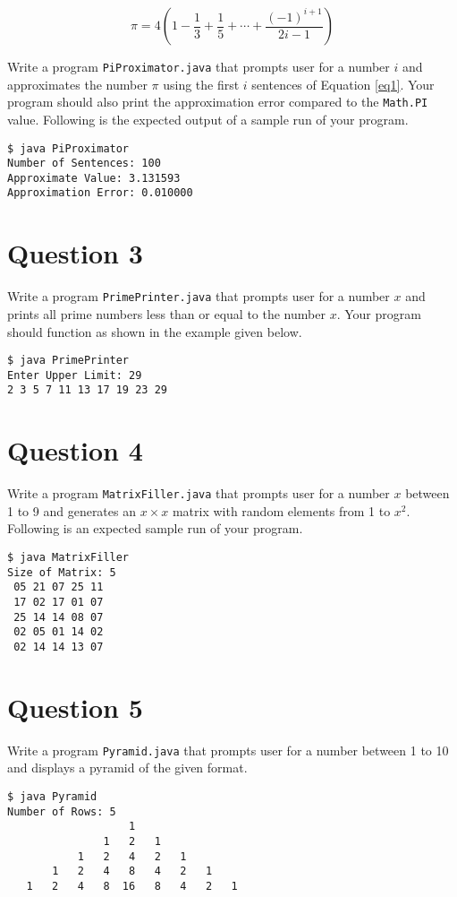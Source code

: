 \begin{equation}
\pi = 4 \left( 1 - \frac{1}{3} + \frac{1}{5} + \cdots + \frac{(-1)^{i+1}}{2i-1} \right)
\label{eq1}
\end{equation}

Write a program \texttt{PiProximator.java} that prompts user for a number $i$ and approximates the number $\pi$ using the first $i$ sentences of Equation \ref{eq1}.
Your program should also print the approximation error compared to the \texttt{Math.PI} value.
Following is the expected output of a sample run of your program.

\begin{verbatim}
$ java PiProximator
Number of Sentences: 100
Approximate Value: 3.131593
Approximation Error: 0.010000
\end{verbatim}

\section*{Question 3}
Write a program \texttt{PrimePrinter.java} that prompts user for a number $x$ and prints all prime numbers less than or equal to the number $x$.
Your program should function as shown in the example given below.

\begin{verbatim}
$ java PrimePrinter
Enter Upper Limit: 29
2 3 5 7 11 13 17 19 23 29
\end{verbatim}

\section*{Question 4}
Write a program \texttt{MatrixFiller.java} that prompts user for a number $x$ between 1 to 9 and generates an $x \times x$ matrix with random elements from 1 to $x^2$.
Following is an expected sample run of your program.

\begin{verbatim}
$ java MatrixFiller
Size of Matrix: 5
 05 21 07 25 11
 17 02 17 01 07
 25 14 14 08 07
 02 05 01 14 02
 02 14 14 13 07
\end{verbatim}

\section*{Question 5}
Write a program \texttt{Pyramid.java} that prompts user for a number between 1 to 10 and displays a pyramid of the given format.

\begin{verbatim}
$ java Pyramid
Number of Rows: 5
                   1
               1   2   1
           1   2   4   2   1
       1   2   4   8   4   2   1
   1   2   4   8  16   8   4   2   1
\end{verbatim}

\newpage

